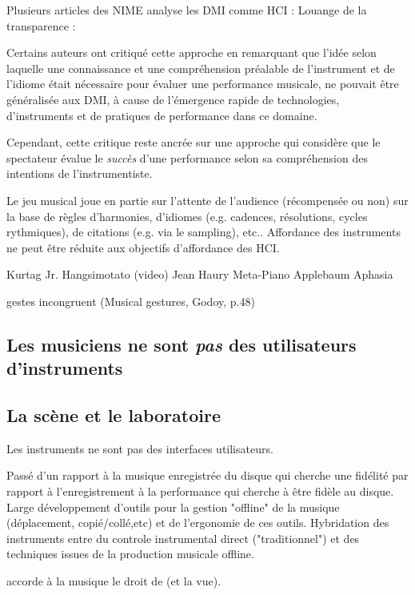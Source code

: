 Plusieurs articles des NIME analyse les DMI comme \gls{HCI} : 
Louange de la transparence : \cite{fels_mapping_2002}

Certains auteurs ont critiqué cette approche \cite{fyans_where_2009} en remarquant que l'idée selon laquelle une connaissance et une compréhension préalable de l'instrument et de l'idiome était nécessaire pour évaluer une performance musicale, ne pouvait être généralisée aux DMI, à cause de l'émergence rapide de technologies, d'instruments et de pratiques de performance dans ce domaine. 

Cependant, cette critique reste ancrée sur une approche qui considère que le spectateur évalue le \textit{succès} d'une performance selon sa compréhension des intentions de l'instrumentiste.



Le jeu musical joue en partie sur l’attente de l’audience (récompensée ou non) sur la base de règles d'harmonies, d’idiomes (e.g. cadences, résolutions, cycles rythmiques), de citations (e.g. via le sampling), etc..
Affordance des instruments ne peut être réduite aux objectifs d’affordance des HCI.


Kurtag Jr. Hangsimotato (video)
Jean Haury Meta-Piano
Applebaum Aphasia

gestes incongruent (Musical gestures, Godoy, p.48)


\subsection{Les musiciens ne sont \emph{pas} des utilisateurs d'instruments}
\subsection{La scène et le laboratoire}

Les instruments ne sont pas des interfaces utilisateurs.

Passé d'un rapport à la musique enregistrée du disque qui cherche une fidélité par rapport à l'enregistrement à la performance qui cherche à être fidèle au disque. \cite{??} 
Large développement d'outils pour la gestion "offline" de la musique (déplacement, copié/collé,etc) et de l'ergonomie de ces outils.
Hybridation des instruments entre du controle instrumental direct ("traditionnel") et des techniques issues de la production musicale offline.


accorde à la musique le droit de  (et la vue).


